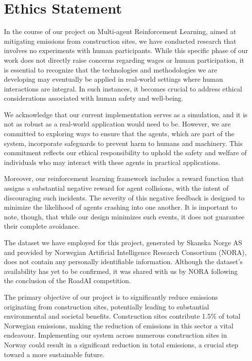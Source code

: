 \documentclass[conference]{IEEEtran}
\begin{document}
	\newpage

	\appendices
	\section{Ethics Statement}
	In the course of our project on Multi-agent Reinforcement Learning, aimed at mitigating \coo{} emissions
	from construction sites, we have conducted research that involves no experiments with human participants.
	While this specific phase of our work does not directly raise concerns regarding wages or human
	participation, it is essential to recognize that the technologies and methodologies we are developing
	may eventually be applied in real-world settings where human interactions are integral. In such instances,
	it becomes crucial to address ethical considerations associated with human safety and well-being.

	We acknowledge that our current implementation serves as a simulation, and it is not as robust as a
	real-world application would need to be. However, we are committed to exploring ways to ensure that the
	agents, which are part of the system, incorporate safeguards to prevent harm to humans and machinery.
	This commitment reflects our ethical responsibility to uphold the safety and welfare of individuals who
	may interact with these agents in practical applications.

	Moreover, our reinforcement learning framework includes a reward function that assigns a substantial
	negative reward for agent collisions, with the intent of discouraging such incidents. The severity of
	this negative feedback is designed to minimize the likelihood of agents crashing into one another. It
	is important to note, though, that while our design minimizes such events, it does not guarantee their
	complete avoidance.

	The dataset we have employed for this project, generated by Skanska Norge AS and provided by Norwegian
	Artificial Intelligence Research Consortium (NORA), does not contain any personally identifiable
	information. Although the dataset's availability has yet to be confirmed, it was shared with us by NORA
	following the conclusion of the RoadAI competition.

	The primary objective of our project is to significantly reduce \coo{} emissions originating from
	construction sites, potentially leading to substantial environmental and societal benefits.
	Construction sites contribute 1.5\% of total Norwegian \coo{} emissions, making the reduction of
	emissions in this sector a vital endeavour. Implementing our system across numerous construction sites
	in Norway could result in a significant reduction in total \coo{} emissions, a crucial step toward a more
	sustainable future.
\end{document}
